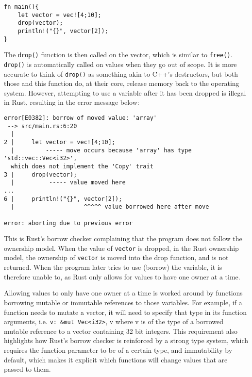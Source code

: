 \begin{code}
\begin{verbatim}
fn main(){
    let vector = vec![4;10];
    drop(vector);
    println!("{}", vector[2]);
}
\end{verbatim}
\label{lst:rust-free}
\end{code}

The \texttt{drop()} function is then called on the vector, which is similar to \texttt{free()}. \texttt{drop()} is automatically called on values when they go out of scope. It is more accurate to think of \texttt{drop()} as something akin to C++'s destructors, but both those and this function do, at their core, release memory back to the operating system. However, attempting to use a variable after it has been dropped is illegal in Rust, resulting in the error message below:

\begin{code}
\begin{verbatim}
error[E0382]: borrow of moved value: 'array'
 --> src/main.rs:6:20
  |
2 |     let vector = vec![4;10];
  |         ----- move occurs because 'array' has type 'std::vec::Vec<i32>',
  which does not implement the 'Copy' trait
3 |     drop(vector);
  |          ----- value moved here
...
6 |     println!("{}", vector[2]);
  |                    ^^^^^ value borrowed here after move

error: aborting due to previous error
\end{verbatim}
\label{lst:rust-borrow-move}
\end{code}

This is Rust's borrow checker complaining that the program does not follow the ownership model. When the value of \texttt{vector} is dropped, in the Rust ownership model, the ownership of \texttt{vector} is moved into the drop function, and is not returned. When the program later tries to use (borrow) the variable, it is therefore unable to, as Rust only allows for values to have one owner at a time.


Allowing values to only have one owner at a time is worked around by functions borrowing mutable or immutable references to those variables. For example, if a function needs to mutate a vector, it will need to specify that type in its function arguments, i.e. \texttt{v: \&mut Vec<i32>}, v where v is of the type of a borrowed mutable reference to a vector containing 32 bit integers.
This requirement also highlights how Rust's borrow checker is reinforced by a strong type system, which requires the function parameter to be of a certain type, and immutability by default, which makes it explicit which functions will change values that are passed to them.

